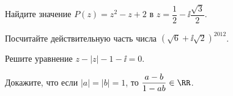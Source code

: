 %
%



\begin{problems}

\item
Найдите значение $P(z) = z^2 - z + 2$ в
$z = \dfrac{1}{2} - \ii \dfrac{\sqrt{3}}{2}$.

\item
Посчитайте действительную часть числа
$\left(\sqrt{6} + \ii \sqrt{2}\right)^{2012}$.

\item
Решите уравнение
$z - |z| - 1 - \ii = 0$.

\item
Докажите, что если
$|a| = |b| = 1$,
то
$\dfrac{a - b}{1 - a b} \in \RR$.

\end{problems}

